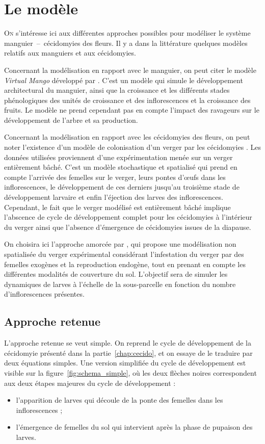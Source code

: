 \chapter{Le modèle}

\lettrine{O}{n} s'intéresse ici aux différentes approches possibles pour modéliser le système manguier~--~cécidomyies des fleurs. 
Il y a dans la littérature quelques modèles relatifs aux manguiers et aux cécidomyies.

Concernant la modélisation en rapport avec le manguier, on peut citer le modèle \emph{Virtual Mango} développé par \citet{fred}.
C'est un modèle qui simule le développement architectural du manguier, ainsi que la croissance et les différents stades phénologiques des unités de croissance et des inflorescences et la croissance des fruits.
Le modèle ne prend cependant pas en compte l'impact des ravageurs sur le développement de l'arbre et sa production.

Concernant la modélisation en rapport avec les cécidomyies des fleurs, on peut noter l'existence d'un modèle de colonisation d'un verger par les cécidomyies \citep{paul}. 
Les données utilisées proviennent d'une expérimentation menée sur un verger entièrement bâché. 
C'est un modèle stochastique et spatialisé qui prend en compte l'arrivée des femelles sur le verger, leurs pontes d'œufs dans les inflorescences, le développement de ces derniers jusqu'au troisième stade de développement larvaire et enfin l'éjection des larves des inflorescences.
Cependant, le fait que le verger modélisé est entièrement bâché implique l'abscence de cycle de développement complet pour les cécidomyies à l'intérieur du verger ainsi que l'absence d'émergence de cécidomyies issues de la diapause.

On choisira ici l'approche amorcée par \citet{laurie}, qui propose une modélisation non spatialisée du verger expérimental considérant l'infestation du verger par des femelles exogènes et la reproduction endogène, tout en prenant en compte les différentes modalités de couverture du sol.
L'objectif sera de simuler les dynamiques de larves à l'échelle de la sous-parcelle en fonction du nombre d'inflorescences présentes.

\section{Approche retenue}

L'approche retenue se veut simple.
On reprend le cycle de développement de la cécidomyie présenté dans la partie~\ref{chap:cecido}, et on essaye de le traduire par deux équations simples.
Une version simplifiée du cycle de développement est visible sur la figure~\ref{fig:schema_simple}, où les deux flèches noires correspondent aux deux étapes majeures du cycle de développement :
\begin{itemize}
 \item l'apparition de larves qui découle de la ponte des femelles dans les inflorescences ;
 \item l'émergence de femelles du sol qui intervient après la phase de pupaison des larves.
 \end{itemize}


